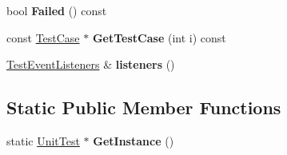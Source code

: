 \begin{DoxyCompactItemize}
\item 
\mbox{\label{classtesting_1_1_unit_test_a706f29e765916616b11a271a65948727}} 
bool {\bfseries Failed} () const
\item 
\mbox{\label{classtesting_1_1_unit_test_a724d4c8be4481e0c1523a22b72dc7dac}} 
const \mbox{\hyperlink{classtesting_1_1_test_case}{Test\+Case}} $\ast$ {\bfseries Get\+Test\+Case} (int i) const
\item 
\mbox{\label{classtesting_1_1_unit_test_aac10085cf7c0d1751306db10cdd953cb}} 
\mbox{\hyperlink{classtesting_1_1_test_event_listeners}{Test\+Event\+Listeners}} \& {\bfseries listeners} ()
\end{DoxyCompactItemize}
\subsection*{Static Public Member Functions}
\begin{DoxyCompactItemize}
\item 
\mbox{\label{classtesting_1_1_unit_test_a24192400b70b3b946746954e9574fb8e}} 
static \mbox{\hyperlink{classtesting_1_1_unit_test}{Unit\+Test}} $\ast$ {\bfseries Get\+Instance} ()
\end{DoxyCompactItemize}
